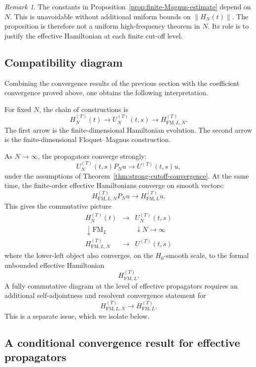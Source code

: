 \documentclass[11pt]{amsart}
\theoremstyle{plain}
\theoremstyle{definition}
\theoremstyle{remark}
\newtheorem{remark}[theorem]{Remark}
\begin{document}
\begin{remark}
The constants in Proposition~\ref{prop:finite-Magnus-estimate} depend
on \(N\).  This is unavoidable without additional uniform bounds on
\(\|H_N(t)\|\).  The proposition is therefore not a uniform
high-frequency theorem in \(N\).  Its role is to justify the effective
Hamiltonian at each finite cut-off level.
\end{remark}

\subsection{Compatibility diagram}

Combining the convergence results of the previous section with the
coefficient convergence proved above, one obtains the following
interpretation.

For fixed \(N\), the chain of constructions is
\[
        H_N^{(T)}(t)
        \longrightarrow
        U_N^{(T)}(t,s)
        \longrightarrow
        H_{\mathrm{FM},L,N}^{(T)}.
\]
The first arrow is the finite-dimensional Hamiltonian evolution.  The
second arrow is the finite-dimensional Floquet--Magnus construction.

As \(N\to\infty\), the propagators converge strongly:
\[
        U_N^{(T)}(t,s)P_Nu
        \longrightarrow
        U^{(T)}(t,s)u,
\]
under the assumptions of Theorem~\ref{thm:strong-cutoff-convergence}.
At the same time, the finite-order effective Hamiltonians converge on
smooth vectors:
\[
        H_{\mathrm{FM},L,N}^{(T)}P_Nu
        \longrightarrow
        H_{\mathrm{FM},L}^{(T)}u.
\]
This gives the commutative picture
\[
\begin{array}{ccc}
H_N^{(T)}(t)
& \longrightarrow &
U_N^{(T)}(t,s)
\\[1mm]
\downarrow \mathrm{FM}_L
&&
\downarrow N\to\infty
\\[1mm]
H_{\mathrm{FM},L,N}^{(T)}
& \longrightarrow &
U^{(T)}(t,s)
\end{array}
\]
where the lower-left object also converges, on the \(H_0\)-smooth scale,
to the formal unbounded effective Hamiltonian
\[
        H_{\mathrm{FM},L}^{(T)}.
\]
A fully commutative diagram at the level of effective propagators
requires an additional self-adjointness and resolvent convergence
statement for
\[
        H_{\mathrm{FM},L,N}^{(T)}
        \longrightarrow
        H_{\mathrm{FM},L}^{(T)}.
\]
This is a separate issue, which we isolate below.

\subsection{A conditional convergence result for effective propagators}
\end{document}
